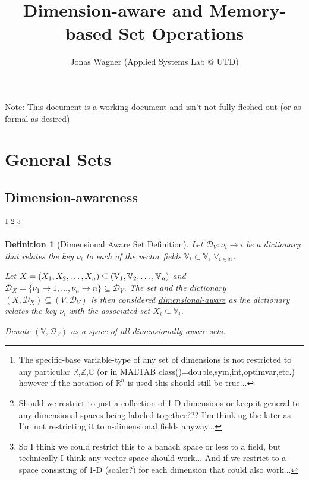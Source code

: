\documentclass[11pt]{article}
\title{Dimension-aware and Memory-based Set Operations}
\author{Jonas Wagner (Applied Systems Lab @ UTD)}
\date{}
\newtheorem{definition}{Definition}
\newcommand{\R}{\mathbb{R}} %
\newcommand{\C}{\mathbb{C}} %
\newcommand{\N}{\mathbb{N}} %
\newcommand{\Z}{\mathbb{Z}} %
\newcommand{\V}{\mathbb{V}} %
\newcommand{\Key}{\nu} %
\newcommand{\Dict}{\mathcal{D}} %
\begin{document}
Note:
This document is a working document and isn't not fully fleshed out (or as formal as desired)

\section{General Sets}

\subsection{Dimension-awareness}
\footnote{
	The specific-base variable-type of any set of dimensions is not restricted to any particular $\R$,$\Z$,$\C$ (or in MALTAB class()=double,sym,int,optimvar,etc.) however if the notation of $\R^n$ is used this should still be true...
} 
\footnote{
	Should we restrict to just a collection of 1-D dimensions or keep it general to any dimensional spaces being labeled together???
	I'm thinking the later as I'm not restricting it to n-dimensional fields anyway...
} 
\footnote{
	So I think we could restrict this to a banach space or less to a field, but technically I think any vector space should work...
	And if we restrict to a space consisting of 1-D (scaler?) for each dimension that could also work...
}	

\begin{definition}[Dimensional Aware Set Definition]
	
	Let $\Dict_{V} : \Key_{i} \to {i}$ be a dictionary that relates the key $\Key_{i}$ to each of the vector fields $\V_{i} \subset \V$, $\forall_{i \in \N}$.

	Let $X = \qty(X_{1},X_{2},\dots,X_{n}) \subseteq \qty(\V_{1}, \V_{2}, \dots, \V_{n})$ and $\Dict_{X} = \{\Key_{1} \to 1,\dots,\Key_{n} \to n\} \subseteq \Dict_{V}$.
	The set and the dictionary $(X,\Dict_{X}) \subseteq (V,\Dict_{V})$ is then considered \emph{\underline{dimensional-aware}} as the dictionary relates the key $\Key_{i}$ with the associated set $X_{i} \subseteq \V_{i}$.

	
	Denote $(\V,\Dict_{V})$ as a space of all \emph{\underline{dimensionally-aware}} sets.
\end{definition}
\end{document}
